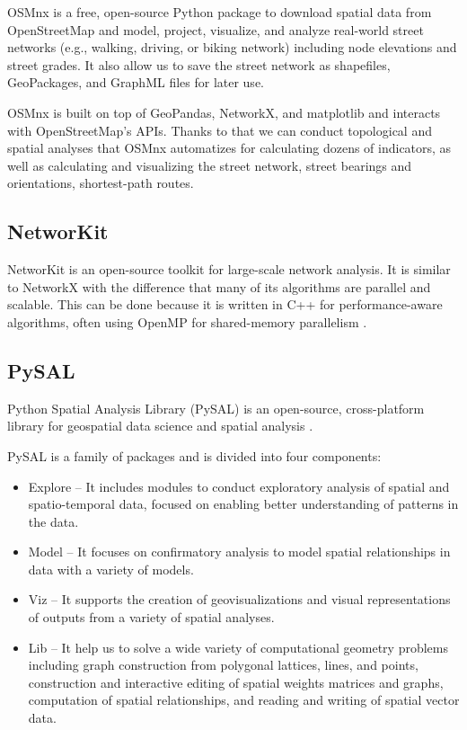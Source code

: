 OSMnx \cite{boeing_osmnx_2017} is a free, open-source Python package to download spatial data from OpenStreetMap and model, project, visualize, and analyze real-world street networks (e.g., walking, driving, or biking network) including node elevations and street grades. It also allow us to save the street network as shapefiles, GeoPackages, and GraphML files for later use.

OSMnx is built on top of GeoPandas, NetworkX, and matplotlib and interacts with OpenStreetMap's APIs. Thanks to that we can conduct topological and spatial analyses that OSMnx automatizes for calculating dozens of indicators, as well as calculating and visualizing the street network, street bearings and orientations, shortest-path routes.


\subsection{NetworKit}

NetworKit is an open-source toolkit for large-scale network analysis. It is similar to NetworkX with the difference that many of its algorithms are parallel and scalable. This can be done because it is written in C++ for performance-aware algorithms, often using OpenMP for shared-memory parallelism \cite{staudt2015networkit}. 

\subsection{PySAL}

Python Spatial Analysis Library (PySAL) is an open-source, cross-platform library for geospatial data science and spatial analysis \cite{pysal2007}.

PySAL is a family of packages and is divided into four components:

\begin{itemize}
	\item Explore -- It includes modules to conduct exploratory analysis of spatial and spatio-temporal data, focused on enabling better understanding of patterns in the data.
	\item Model -- It focuses on confirmatory analysis to model spatial relationships in data with a variety of models.
	\item Viz -- It supports the creation of geovisualizations and visual representations of outputs from a variety of spatial analyses. 
	\item Lib -- It help us to solve a wide variety of computational geometry problems including graph construction from polygonal lattices, lines, and points, construction and interactive editing of spatial weights matrices and graphs, computation of spatial relationships, and reading and writing of spatial vector data.
\end{itemize}
